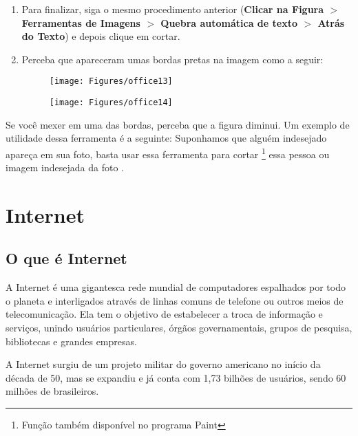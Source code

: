 \documentclass[hidelinks,12pt]{article}
\begin{document}
\begin{enumerate}
			\item Para finalizar, siga o mesmo procedimento anterior (\textbf{Clicar na Figura $>$ Ferramentas de Imagens $>$ Quebra automática de texto $>$ Atrás do Texto}) e depois clique em cortar.
			
			\newpage
			
			\item  Perceba que apareceram umas bordas pretas na imagem como a seguir:
			\begin{figure}[!htbp]
				\centering
				\begin{minipage}[b]{0.9\textwidth}
					\texttt{[image: Figures/office13]}
					
				\end{minipage}
				\hfill
				\begin{minipage}[b]{0.9\textwidth}
					\texttt{[image: Figures/office14]}
					
				\end{minipage}
			\end{figure}
			
			
		\end{enumerate}
		
		Se você mexer em uma das bordas, perceba que a figura diminui. Um exemplo de utilidade dessa ferramenta é a seguinte: Suponhamos que alguém indesejado apareça em sua foto, basta usar essa ferramenta para cortar \footnote{Função também disponível no programa Paint} essa pessoa ou imagem indesejada da foto .
		
		\section{Internet}
		
		\subsection{O que é Internet}
		
		A Internet é uma gigantesca rede mundial de computadores espalhados por todo o planeta e interligados através de linhas comuns de telefone ou outros meios de telecomunicação. Ela tem o objetivo de estabelecer a troca de informação e serviços, unindo usuários particulares, órgãos governamentais, grupos de pesquisa, bibliotecas e grandes empresas. 

		A Internet surgiu de um projeto militar do governo americano no início da década de 50, mas se expandiu e já conta com 1,73 bilhões de usuários, sendo 60 milhões de brasileiros.
		
\end{document}
